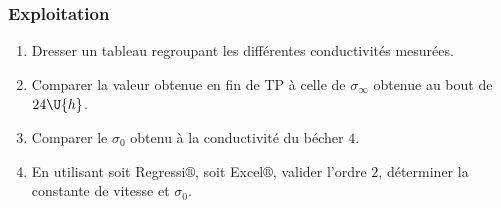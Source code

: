 \documentclass{tp}
\begin{document}


\subsubsection{Exploitation}


\begin{enumerate}
\setcounter{enumi}{\thesave}

\item Dresser un tableau regroupant les différentes conductivités mesurées.
\item Comparer la valeur obtenue en fin de TP à celle de $\sigma_{\infty}$ obtenue au bout de $24 \U{h}$.
\item Comparer le $\sigma_0$ obtenu à la conductivité du bécher $4$.
\item En utilisant soit Regressi$\circledR$, soit Excel$\circledR$, valider l'ordre $2$, déterminer la constante de vitesse et $\sigma_0$.

\end{enumerate}
\end{document}

